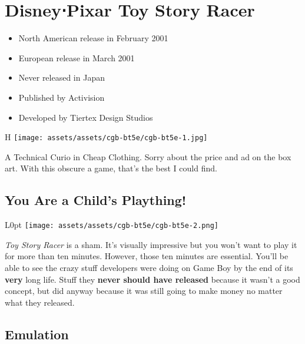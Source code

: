 \documentclass{book}
\begin{document}
\begingroup \chapter*{Disney⋅Pixar Toy Story Racer} \endgroup

\begin{itemize} \setlength\itemsep{-0.4em}
\item North American release in February 2001
\item European release in March 2001
\item Never released in Japan
\item Published by Activision
\item Developed by Tiertex Design Studios
\end{itemize}\noindent

\begin{wrapfigure}{H}{\linewidth}
\vskip 4pt
\centering \texttt{[image: assets/assets/cgb-bt5e/cgb-bt5e-1.jpg]}\par\pagetwodescription A Technical Curio in Cheap Clothing. Sorry about the price and ad on the box art. With this obscure a game, that’s the best I could find.\end{wrapfigure}
\clearpage

\FloatBarrier\needspace{10mm}\section*{You Are a Child’s Plaything!}\nopagebreak[4]

\begin{wrapfigure}{L}{0pt} \texttt{[image: assets/assets/cgb-bt5e/cgb-bt5e-2.png]}\end{wrapfigure}
\emph{Toy Story Racer} is a sham. It’s visually impressive but you won’t want to play it for more than ten minutes. However, those ten minutes are essential. You’ll be able to see the crazy stuff developers were doing on Game Boy by the end of its \textbf{very} long life. Stuff they \textbf{never should have released} because it wasn’t a good concept, but did anyway because it was still going to make money no matter what they released.

\FloatBarrier\needspace{10mm}\section*{Emulation}\nopagebreak[4]
\end{document}
